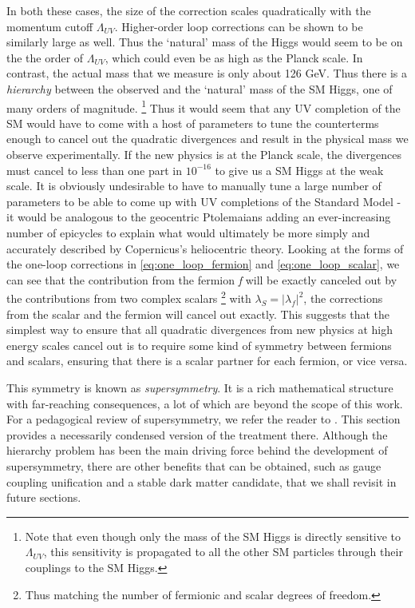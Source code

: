 \strictpagecheck
In both these cases, the size of the correction scales quadratically with the momentum cutoff $\Lambda_{UV}$. Higher-order loop corrections can be shown to be similarly large as well. Thus the `natural' mass of the Higgs would seem to be on the the order of $\Lambda_{UV}$, which could even be as high as the Planck scale. In contrast, the actual mass that we measure is only about 126 GeV. Thus there is a \emph{hierarchy} between the observed and the `natural' mass of the SM Higgs, one of many orders of magnitude. \footnote{Note that even though only the mass of the SM Higgs is directly sensitive to $\Lambda_{UV}$, this sensitivity is propagated to all the other SM particles through their couplings to the SM Higgs.}
Thus it would seem that any UV completion of the SM would have to come with a host of parameters to tune the counterterms enough to cancel out the quadratic divergences and result in the physical mass we observe experimentally. If the new physics is at the Planck scale, the divergences must cancel to less than one part in $10^{-16}$ to give us a SM Higgs at the weak scale.
It is obviously undesirable to have to manually tune a large number of parameters to be able to come up with UV completions of the Standard Model - it would be analogous to the geocentric Ptolemaians adding an ever-increasing number of epicycles to explain what would ultimately be more simply and accurately described by Copernicus's heliocentric theory. 
Looking at the forms of the one-loop corrections in \eqref{eq:one_loop_fermion} and \eqref{eq:one_loop_scalar}, we can see that the contribution from the fermion \emph{f} will be exactly canceled out by the contributions from two complex scalars \footnote{Thus matching the number of fermionic and scalar degrees of freedom.} with $\lambda_S = |\lambda_f|^2$, the corrections from the scalar and the fermion will cancel out exactly. This suggests that the simplest way to ensure that all quadratic divergences from new physics at high energy scales cancel out is to require some kind of symmetry between fermions and scalars, ensuring that there is a scalar partner for each fermion, or vice versa.

This symmetry is known as \emph{supersymmetry}. It is a rich mathematical structure with far-reaching consequences, a lot of which are beyond the scope of this work. For a pedagogical review of supersymmetry, we refer the reader to \citep{Martin1997}. This section provides a necessarily condensed version of the treatment there. Although the hierarchy problem has been the main driving force behind the development of supersymmetry, there are other benefits that can be obtained, such as gauge coupling unification and a stable dark matter candidate, that we shall revisit in future sections.

